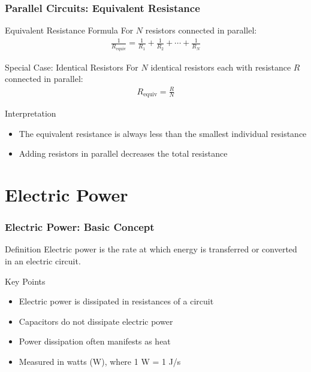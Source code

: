 \documentclass{beamer}
\begin{document}
\begin{frame}
\frametitle{Parallel Circuits: Equivalent Resistance}
\begin{block}{Equivalent Resistance Formula}
For $N$ resistors connected in parallel:
\begin{align}
\frac{1}{R_{\text{equiv}}} = \frac{1}{R_1} + \frac{1}{R_2} + \cdots + \frac{1}{R_N}
\end{align}
\end{block}

\begin{block}{Special Case: Identical Resistors}
For $N$ identical resistors each with resistance $R$ connected in parallel:
\begin{align}
R_{\text{equiv}} = \frac{R}{N}
\end{align}
\end{block}

\begin{block}{Interpretation}
\begin{itemize}
\item The equivalent resistance is always less than the smallest individual resistance
\item Adding resistors in parallel decreases the total resistance
\end{itemize}
\end{block}
\end{frame}

\section{Electric Power}

\begin{frame}
\frametitle{Electric Power: Basic Concept}
\begin{block}{Definition}
Electric power is the rate at which energy is transferred or converted in an electric circuit.
\end{block}

\begin{block}{Key Points}
\begin{itemize}
\item Electric power is dissipated in resistances of a circuit
\item Capacitors do not dissipate electric power
\item Power dissipation often manifests as heat
\item Measured in watts (W), where 1 W = 1 J/s
\end{itemize}
\end{block}
\end{frame}
\end{document}
